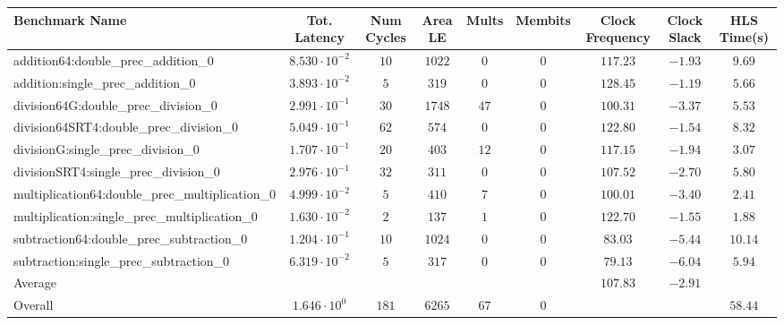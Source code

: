 \begin{tabular}{|l|c|c|c|c|c|c|c|c|}
\hline
Benchmark Name                                   & Tot. Latency            & Num Cycles & Area LE  & Mults  & Membits & Clock Frequency & Clock Slack & HLS Time(s) \\
\hline
addition64:double\_prec\_addition\_0             & $ 8.530 \cdot 10^{-2} $ & $ 10     $ & $ 1022 $ & $ 0  $ & $ 0   $ & $ 117.23      $ & $ -1.93   $ & $ 9.69    $ \\
addition:single\_prec\_addition\_0               & $ 3.893 \cdot 10^{-2} $ & $ 5      $ & $ 319  $ & $ 0  $ & $ 0   $ & $ 128.45      $ & $ -1.19   $ & $ 5.66    $ \\
division64G:double\_prec\_division\_0            & $ 2.991 \cdot 10^{-1} $ & $ 30     $ & $ 1748 $ & $ 47 $ & $ 0   $ & $ 100.31      $ & $ -3.37   $ & $ 5.53    $ \\
division64SRT4:double\_prec\_division\_0         & $ 5.049 \cdot 10^{-1} $ & $ 62     $ & $ 574  $ & $ 0  $ & $ 0   $ & $ 122.80      $ & $ -1.54   $ & $ 8.32    $ \\
divisionG:single\_prec\_division\_0              & $ 1.707 \cdot 10^{-1} $ & $ 20     $ & $ 403  $ & $ 12 $ & $ 0   $ & $ 117.15      $ & $ -1.94   $ & $ 3.07    $ \\
divisionSRT4:single\_prec\_division\_0           & $ 2.976 \cdot 10^{-1} $ & $ 32     $ & $ 311  $ & $ 0  $ & $ 0   $ & $ 107.52      $ & $ -2.70   $ & $ 5.80    $ \\
multiplication64:double\_prec\_multiplication\_0 & $ 4.999 \cdot 10^{-2} $ & $ 5      $ & $ 410  $ & $ 7  $ & $ 0   $ & $ 100.01      $ & $ -3.40   $ & $ 2.41    $ \\
multiplication:single\_prec\_multiplication\_0   & $ 1.630 \cdot 10^{-2} $ & $ 2      $ & $ 137  $ & $ 1  $ & $ 0   $ & $ 122.70      $ & $ -1.55   $ & $ 1.88    $ \\
subtraction64:double\_prec\_subtraction\_0       & $ 1.204 \cdot 10^{-1} $ & $ 10     $ & $ 1024 $ & $ 0  $ & $ 0   $ & $ 83.03       $ & $ -5.44   $ & $ 10.14   $ \\
subtraction:single\_prec\_subtraction\_0         & $ 6.319 \cdot 10^{-2} $ & $ 5      $ & $ 317  $ & $ 0  $ & $ 0   $ & $ 79.13       $ & $ -6.04   $ & $ 5.94    $ \\
\hline
Average                                          & $                     $ & $        $ & $      $ & $    $ & $     $ & $ 107.83      $ & $ -2.91   $ & $         $ \\
\hline
Overall                                          & $ 1.646 \cdot 10^{0}  $ & $ 181    $ & $ 6265 $ & $ 67 $ & $ 0   $ & $             $ & $         $ & $ 58.44   $ \\
\hline
\end{tabular}
